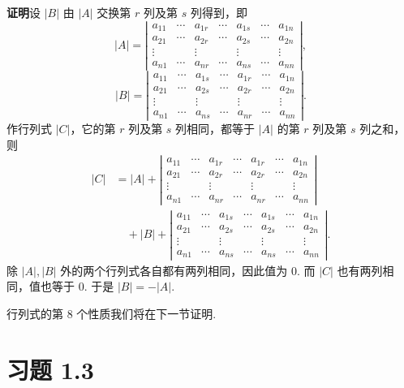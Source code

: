 \documentclass[UTF8, 12pt, fontset=fandol, oneside]{ctexart}
\begin{document}
\noindent\textbf{证明}\quad 设 $|B|$ 由 $|A|$ 交换第 $r$ 列及第 $s$ 列得到，即
\[
|A|=
\left|\begin{array}{ccccccc}
a_{11} & \cdots & a_{1r} & \cdots & a_{1s} & \cdots & a_{1n}\\
a_{21} & \cdots & a_{2r} & \cdots & a_{2s} & \cdots & a_{2n}\\
\vdots & & \vdots & & \vdots & & \vdots\\
a_{n1} & \cdots & a_{nr} & \cdots & a_{ns} & \cdots & a_{nn}
\end{array}\right|,
\]
\[
|B|=
\left|\begin{array}{ccccccc}
a_{11} & \cdots & a_{1s} & \cdots & a_{1r} & \cdots & a_{1n}\\
a_{21} & \cdots & a_{2s} & \cdots & a_{2r} & \cdots & a_{2n}\\
\vdots & & \vdots & & \vdots & & \vdots\\
a_{n1} & \cdots & a_{ns} & \cdots & a_{nr} & \cdots & a_{nn}
\end{array}\right|.
\]
作行列式 $|C|$，它的第 $r$ 列及第 $s$ 列相同，都等于 $|A|$ 的第 $r$ 列及第 $s$ 列之和，则
\[
\begin{aligned}
|C|
&=|A|+
\left|\begin{array}{ccccccc}
a_{11} & \cdots & a_{1r} & \cdots & a_{1r} & \cdots & a_{1n}\\
a_{21} & \cdots & a_{2r} & \cdots & a_{2r} & \cdots & a_{2n}\\
\vdots & & \vdots & & \vdots & & \vdots\\
a_{n1} & \cdots & a_{nr} & \cdots & a_{nr} & \cdots & a_{nn}
\end{array}\right|\\
&\quad+|B|+
\left|\begin{array}{ccccccc}
a_{11} & \cdots & a_{1s} & \cdots & a_{1s} & \cdots & a_{1n}\\
a_{21} & \cdots & a_{2s} & \cdots & a_{2s} & \cdots & a_{2n}\\
\vdots & & \vdots & & \vdots & & \vdots\\
a_{n1} & \cdots & a_{ns} & \cdots & a_{ns} & \cdots & a_{nn}
\end{array}\right|.
\end{aligned}
\]
除 $|A|,|B|$ 外的两个行列式各自都有两列相同，因此值为 0. 而 $|C|$ 也有两列相同，值也等于 0. 于是 $|B|=-|A|$.

行列式的第 8 个性质我们将在下一节证明.

\section*{习题 1.3}
\end{document}
